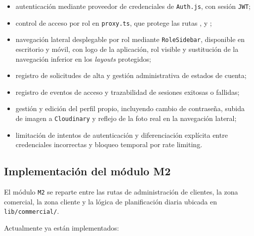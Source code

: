\begin{itemize}
    \item autenticación mediante proveedor de credenciales de \texttt{Auth.js}, con sesión \texttt{JWT};
    \item control de acceso por rol en \texttt{proxy.ts}, que protege las rutas ,  y ;
    \item navegación lateral desplegable por rol mediante \texttt{RoleSidebar}, disponible en escritorio y móvil, con logo de la aplicación, rol visible y sustitución de la navegación inferior en los \textit{layouts} protegidos;
    \item registro de solicitudes de alta y gestión administrativa de estados de cuenta;
    \item registro de eventos de acceso y trazabilidad de sesiones exitosas o fallidas;
    \item gestión y edición del perfil propio, incluyendo cambio de contraseña, subida de imagen a \texttt{Cloudinary} y reflejo de la foto real en la navegación lateral;
    \item limitación de intentos de autenticación y diferenciación explícita entre credenciales incorrectas y bloqueo temporal por rate limiting.
\end{itemize}

\subsection{Implementación del módulo M2}

El módulo \texttt{M2} se reparte entre las rutas de administración de clientes, la zona comercial, la zona cliente y la lógica de planificación diaria ubicada en \texttt{lib/commercial/}.

Actualmente ya están implementados:

